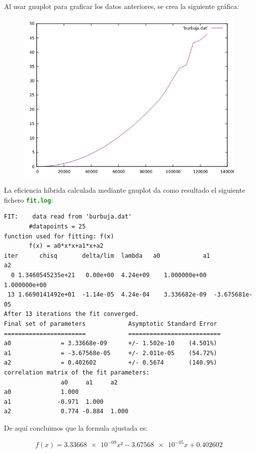 \documentclass[12pt, spanish]{article}
\def\code#1{\texttt{#1}}
\begin{document}
Al usar gnuplot para graficar los datos anteriores, se crea la siguiente gráfica:
\begin{figure}[H]
  \centering
  \includegraphics[scale = 0.8]{burbuja.png}
\end{figure}

La eficiencia híbrida calculada mediante gnuplot da como resultado el siguiente fichero  \textbf{\textcolor{ForestGreen}{\code{fit.log}}}:

\begin{verbatim}
FIT:    data read from 'burbuja.dat'
       #datapoints = 25
function used for fitting: f(x)
       f(x) = a0*x*x+a1*x+a2
iter      chisq       delta/lim  lambda   a0            a1            a2
  0 1.3460545235e+21   0.00e+00  4.24e+09    1.000000e+00   1.000000e+00
 13 1.6690141492e+01  -1.14e-05  4.24e-04    3.336682e-09  -3.675681e-05
After 13 iterations the fit converged.
Final set of parameters            Asymptotic Standard Error
=======================            ==========================
a0              = 3.33668e-09      +/- 1.502e-10    (4.501%)
a1              = -3.67568e-05     +/- 2.011e-05    (54.72%)
a2              = 0.402602         +/- 0.5674       (140.9%)
correlation matrix of the fit parameters:
                a0     a1     a2
a0              1.000
a1             -0.971  1.000
a2              0.774 -0.884  1.000
\end{verbatim}

De aquí concluimos que la formula ajustada es:

\[f(x)=\num{3.33668e-09}x² - \num{3.67568e-05}x + 0.402602\]
\end{document}
